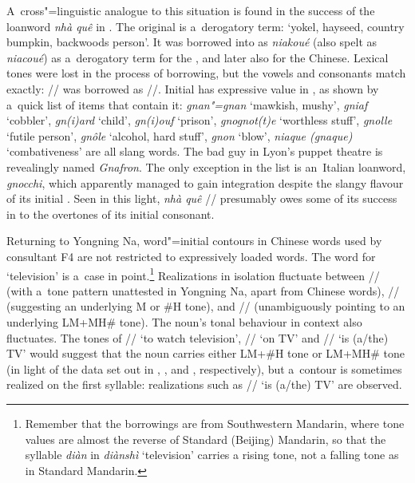 A~cross"=linguistic analogue to this situation is found in the success of the  loanword \textit{nhà quê} in . The original  is a~derogatory term: ‘yokel, hayseed, country bumpkin, backwoods person’. It was borrowed into  as \textit{niakoué} (also spelt as \textit{niacoué}) as a~derogatory term for the , and later also for the Chinese. Lexical tones were lost in the process of borrowing, but the vowels and consonants match exactly:  // was borrowed as //. Initial  has expressive value in , as shown by a~quick list of items that contain it: \textit{gnan"=gnan} ‘mawkish, mushy’, \textit{gniaf} ‘cobbler’, \textit{gn(i)ard} ‘child’, \textit{gn(i)ouf} ‘prison’, \textit{gnognot(t)e} ‘worthless stuff’, \textit{gnolle} ‘futile person’, \textit{gnôle} ‘alcohol, hard stuff’, \textit{gnon} ‘blow’, \textit{niaque (gnaque)} ‘combativeness’ are all slang words. The bad guy in Lyon's puppet theatre is revealingly named \textit{Gnafron}. The only exception in the list is an~Italian loanword, \textit{gnocchi}, which apparently managed to gain integration despite the slangy flavour of its initial . Seen in this light,  \textit{nhà quê} // presumably owes some of its success in  to the overtones of its initial consonant.

Returning to Yongning Na, word"=initial contours in Chinese words used by consultant F4 are not restricted to expressively loaded words. The word for ‘television’ is a~case in point.\footnote{Remember that the borrowings are from Southwestern {Mandarin}, where tone values are almost the reverse of Standard (Beijing) Mandarin, so that the syllable \textit{diàn}  in \textit{diànshì}  ‘television’ carries a rising tone, not a falling tone as in Standard Mandarin.} Realizations in isolation fluctuate between // (with a~tone pattern unattested in Yongning Na, apart from Chinese words), // (suggesting an underlying M or \#H tone), and // (unambiguously pointing to an underlying LM+MH\# tone). The noun's tonal behaviour in context also fluctuates. The tones of // ‘to watch television’, // ‘on TV’ and // ‘is \mbox{(a/the)} TV’ would suggest that the noun carries either LM+\#H tone or LM+MH\# tone (in light of the data set out in , , and , respectively), but a~contour is sometimes realized on the first syllable: realizations such as // ‘is \mbox{(a/the)} TV’ are observed.


